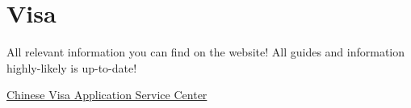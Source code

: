 

\chapter{Visa}\label{ru:ru_visa}

All relevant information you can find on the website!
All guides and information highly-likely is up-to-date!
\begin{center}
\href{https://bio.visaforchina.cn/MOW3_RU/qianzhengyewu}{\Large Chinese Visa Application Service Center}
\end{center}

